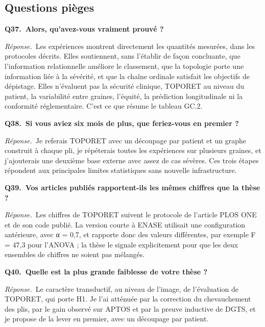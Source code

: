 \documentclass[11pt,a4paper]{article}
\begin{document}
\subsection*{Questions pièges}
\textbf{Q37.~Alors, qu'avez-vous vraiment prouvé ?}\par\nopagebreak
\textit{Réponse.}~Les expériences montrent directement les quantités mesurées, dans les protocoles décrits. Elles soutiennent, sans l'établir de façon concluante, que l'information relationnelle améliore le classement, que la topologie porte une information liée à la sévérité, et que la chaîne ordinale satisfait les objectifs de dépistage. Elles n'évaluent pas la sécurité clinique, TOPORET au niveau du patient, la variabilité entre graines, l'équité, la prédiction longitudinale ni la conformité réglementaire. C'est ce que résume le tableau GC.2.\par\medskip
\textbf{Q38.~Si vous aviez six mois de plus, que feriez-vous en premier ?}\par\nopagebreak
\textit{Réponse.}~Je referais TOPORET avec un découpage par patient et un graphe construit à chaque pli, je répéterais toutes les expériences sur plusieurs graines, et j'ajouterais une deuxième base externe avec assez de cas sévères. Ces trois étapes répondent aux principales limites statistiques sans nouvelle infrastructure.\par\medskip
\textbf{Q39.~Vos articles publiés rapportent-ils les mêmes chiffres que la thèse ?}\par\nopagebreak
\textit{Réponse.}~Les chiffres de TOPORET suivent le protocole de l'article PLOS ONE et de son code publié. La version courte à ENASE utilisait une configuration antérieure, avec α = 0,7, et rapporte donc des valeurs différentes, par exemple F = 47,3 pour l'ANOVA ; la thèse le signale explicitement pour que les deux ensembles de chiffres ne soient pas mélangés.\par\medskip
\textbf{Q40.~Quelle est la plus grande faiblesse de votre thèse ?}\par\nopagebreak
\textit{Réponse.}~Le caractère transductif, au niveau de l'image, de l'évaluation de TOPORET, qui porte H1. Je l'ai atténuée par la correction du chevauchement des plis, par le gain observé sur APTOS et par la preuve inductive de DGTS, et je propose de la lever en premier, avec un découpage par patient.\par\medskip
\end{document}
